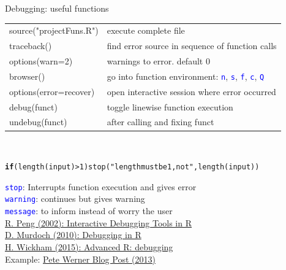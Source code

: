 \documentclass[xcolor=table,       handout,    xcolor=dvipsnames]{beamer}\usepackage[]{graphicx}\usepackage[]{color}
\makeatletter
\newcommand{\hlnum}[1]{\textcolor[rgb]{0,0,0}{#1}}
\newcommand{\hlstr}[1]{\textcolor[rgb]{0.545,0.137,0.137}{#1}}
\newcommand{\hlopt}[1]{\textcolor[rgb]{0,0,0}{#1}}
\newcommand{\hlstd}[1]{\textcolor[rgb]{0,0,0}{#1}}
\newcommand{\hlkwa}[1]{\textcolor[rgb]{1,0,0}{\textbf{#1}}}
\newcommand{\hlkwd}[1]{\textcolor[rgb]{0,0,1}{#1}}
\newenvironment{kframe}{%
 \def\at@end@of@kframe{}%
 \ifinner\ifhmode%
  \def\at@end@of@kframe{\end{minipage}}%
  \begin{minipage}{\columnwidth}%
 \fi\fi%
 \def\FrameCommand##1{\hskip\@totalleftmargin \hskip-\fboxsep
 \colorbox{shadecolor}{##1}\hskip-\fboxsep
     \hskip-\linewidth \hskip-\@totalleftmargin \hskip\columnwidth}%
 \MakeFramed {\advance\hsize-\width
   \@totalleftmargin\z@ \linewidth\hsize
   \@setminipage}}%
 {\par\unskip\endMakeFramed%
 \at@end@of@kframe}
\newenvironment{knitrout}{}{} %
\newcommand{\rcode}[1]{\texttt{\textcolor{Blue}{#1}}} %
\makeatother
\begin{document}
\begin{frame}[fragile]{Debugging: useful functions}
\begin{tabular}{ll}
\pause source("projectFuns.R") & execute complete file\\
\pause traceback() & find error source in sequence of function calls\\
\pause options(warn=2) & warnings to error. default 0\\
\pause browser() & go into function environment: \rcode{n}, \rcode{s}, \rcode{f}, \rcode{c}, \rcode{Q}\\
\pause \alert{options(error=recover)} & \alert{open interactive session where error occurred}\\
\pause debug(funct) & toggle linewise function execution\\
\pause undebug(funct) & after calling and fixing funct\\
\end{tabular}\\
\pause
\vspace{-0.5em}
\begin{knitrout}\footnotesize
{}\color{fgcolor}\begin{kframe}
\begin{alltt}
\hlkwa{if}\hlstd{(}\hlkwd{length}\hlstd{(input)}\hlopt{>}\hlnum{1}\hlstd{)} \hlkwd{stop}\hlstd{(}\hlstr{"length must be 1, not "}\hlstd{,} \hlkwd{length}\hlstd{(input))}
\end{alltt}
\end{kframe}
\end{knitrout}
\vspace{-1em}
\pause
\rcode{stop}: Interrupts function execution and gives error\\
\rcode{warning}: continues but gives warning\\
\rcode{message}: to inform instead of worry the user\\[1em]
\pause
\href{http://www.biostat.jhsph.edu/~rpeng/docs/R-debug-tools.pdf}{R. Peng (2002): Interactive Debugging Tools in R}\\
\href{http://www.stats.uwo.ca/faculty/murdoch/software/debuggingR/}{D. Murdoch (2010): Debugging in R}\\
\href{http://adv-r.had.co.nz/Exceptions-Debugging.html}{H. Wickham (2015): Advanced R: debugging}\\
Example: \href{https://www.r-bloggers.com/tracking-down-errors-in-r/}{Pete Werner Blog Post (2013)}
\end{frame}
\end{document}

